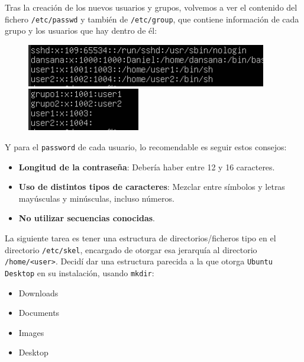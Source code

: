 \documentclass[10pt]{article}
\begin{document}
	Tras la creación de los nuevos usuarios y grupos, volvemos a ver el contenido del fichero \verb|/etc/passwd| y también de \verb|/etc/group|, que contiene información de cada grupo y los usuarios que hay dentro de él:
	\begin{figure}[H]
		\centering
		\begin{minipage}{0.48\textwidth}
			\centering
			\includegraphics[width=\linewidth]{Recursos/passwdNuevo.png}
		\end{minipage}\hfill
		\begin{minipage}{0.48\textwidth}
			\centering
			\includegraphics[width=\linewidth]{Recursos/groupNuevo.png}
		\end{minipage}
	\end{figure}
	Y para el \verb|password| de cada usuario, lo recomendable es seguir estos consejos:
	\begin{itemize}
		\item \textbf{Longitud de la contraseña}: Debería haber entre 12 y 16 caracteres.
		\item \textbf{Uso de distintos tipos de caracteres}: Mezclar entre símbolos y letras mayúsculas y minúsculas, incluso números.
		\item \textbf{No utilizar secuencias conocidas}.
	\end{itemize}
	La siguiente tarea es tener una estructura de directorios/ficheros tipo en el directorio \verb|/etc/skel|, encargado de otorgar esa jerarquía al directorio \verb|/home/<user>|. Decidí dar una estructura parecida a la que otorga \verb|Ubuntu Desktop| en su instalación, usando \verb|mkdir|: 
	\begin{itemize}
		\item Downloads
		\item Documents
		\item Images
		\item Desktop
	\end{itemize}
\end{document}
